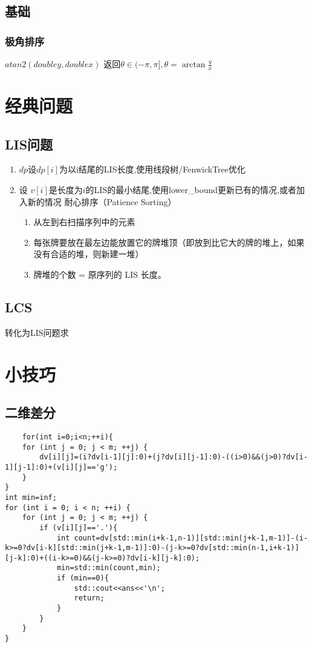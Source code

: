 \documentclass[UTF8]{ctexart}
\begin{document}
\subsection{基础}
\subsubsection{极角排序}
$atan2(double y,double x)$ 返回$\theta\in ( -\pi , \pi ], \theta = \arctan \frac{y}{x}$
\section{经典问题}
\subsection{LIS问题}
\begin{enumerate}
    \item $dp$设$dp[i]$为以i结尾的LIS长度,使用线段树/FenwickTree优化
    \item 设 $v[i]$是长度为$i$的LIS的最小结尾,使用lower\_bound更新已有的情况,或者加入新的情况
    耐心排序（Patience Sorting）
    \begin{enumerate}
        \item 从左到右扫描序列中的元素
        \item 每张牌要放在最左边能放置它的牌堆顶（即放到比它大的牌的堆上，如果没有合适的堆，则新建一堆）
        \item 牌堆的个数 = 原序列的 LIS 长度。
    \end{enumerate}
\end{enumerate}
\subsection{LCS}
转化为LIS问题求
\section{小技巧}
\subsection{二维差分}
\begin{lstlisting}
    for(int i=0;i<n;++i){
    for (int j = 0; j < m; ++j) {
        dv[i][j]=(i?dv[i-1][j]:0)+(j?dv[i][j-1]:0)-((i>0)&&(j>0)?dv[i-1][j-1]:0)+(v[i][j]=='g');
    }
}
int min=inf;
for (int i = 0; i < n; ++i) {
    for (int j = 0; j < m; ++j) {
        if (v[i][j]=='.'){
            int count=dv[std::min(i+k-1,n-1)][std::min(j+k-1,m-1)]-(i-k>=0?dv[i-k][std::min(j+k-1,m-1)]:0)-(j-k>=0?dv[std::min(n-1,i+k-1)][j-k]:0)+((i-k>=0)&&(j-k>=0)?dv[i-k][j-k]:0);
            min=std::min(count,min);
            if (min==0){
                std::cout<<ans<<'\n';
                return;
            }
        }
    }
}
\end{lstlisting}
\end{document}
